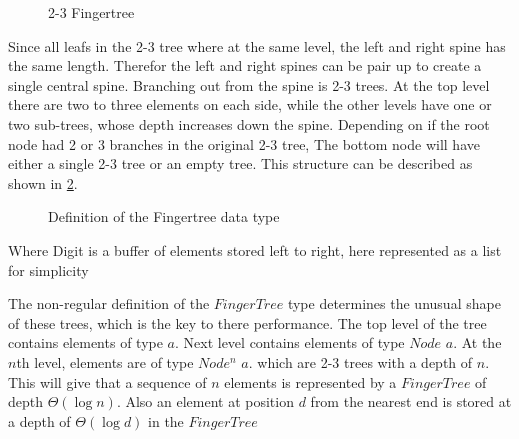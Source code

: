 \begin{figure}[!h]
\centering
{} 
\caption{2-3 Fingertree
\label{fig:fingertree}}
\end{figure}

Since all leafs in the 2-3 tree where at the same level, the left and right
spine has the same length. Therefor the left and right spines can be pair up to
create a single central spine. Branching out from the spine is 2-3 trees. At the
top level there are two to three elements on each side, while the other levels
have one or two sub-trees, whose depth increases down the spine. Depending on if
the root node had 2 or 3 branches in the original 2-3 tree, The bottom node will
have either a single 2-3 tree or an empty tree. This structure can be described
as shown in \cref{fig:DataTypeFingertree}.

\begin{figure}[h!]

\caption{Definition of the Fingertree data type \label{fig:DataTypeFingertree}}
\end{figure}

Where Digit is a buffer of elements stored left to right, here represented as a
list for simplicity

The non-regular definition of the $FingerTree$ type determines the unusual shape
of these trees, which is the key to there performance. The top level of the tree
contains elements of type $a$. Next level contains elements of type $Node$ $a$.
At the $n$th level, elements are of type $Node^n$ $a$. which are 2-3 trees with
a depth of $n$. This will give that a sequence of $n$ elements is represented by
a $FingerTree$ of depth $\Theta(\log n)$. Also an element at position $d$ from
the nearest end is stored at a depth of $\Theta(\log d)$ in the $FingerTree$


